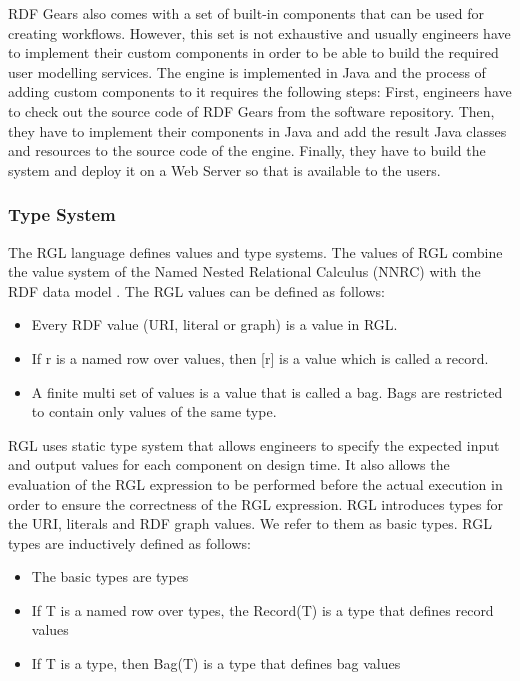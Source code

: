 RDF Gears also comes with a set of built-in components that can be used for creating workflows. However, this set is not exhaustive and usually engineers have to implement their custom components in order to be able to build the required user modelling services. The engine is implemented in Java and the process of adding custom components to it requires the following steps: First, engineers have to check out the source code of RDF Gears from the software repository. Then, they have to implement their components in Java and add the result Java classes and resources to the source code of the engine.  Finally, they have to build the system and deploy it on a Web Server so that is available to the users.

\subsubsection{Type System}

The RGL language defines values and type systems. The values of RGL combine the value system of the Named Nested Relational Calculus (NNRC) with the RDF data model \cite{feliksik2011}. The RGL values can be defined as follows:

\begin{itemize}
	\item Every RDF value (URI, literal or graph) is a value in RGL.
	
	\item If r is a named row over values, then [r] is a value which is called a record.
	
	\item A finite multi set of values is a value that is called a bag. Bags are restricted to contain only values of the same type.
\end{itemize}

RGL uses static type system that allows engineers to specify the expected input and output values for each component on design time. It also allows the evaluation of the RGL expression to be performed before the actual execution in order to ensure the correctness of the RGL expression. RGL introduces types for the URI, literals and RDF graph values. We refer to them as basic types. RGL types are inductively defined as follows:

\begin{itemize}
	\item The basic types are types
	\item If T is a named row over types, the Record(T) is a type that defines record values
	\item If T is a type, then Bag(T) is a type that defines bag values
\end{itemize}

